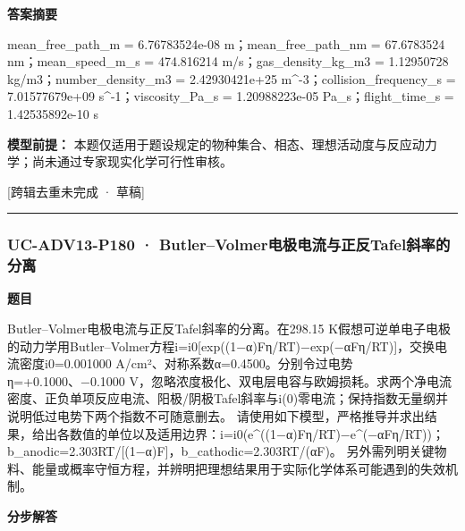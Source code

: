 \documentclass[UTF8,11pt,a4paper]{ctexart}
\begin{document}
\noindent\textbf{答案摘要}\par
mean\_free\_path\_m = 6.76783524e-08 m；mean\_free\_path\_nm = 67.6783524 nm；mean\_speed\_m\_s = 474.816214 m/s；gas\_density\_kg\_m3 = 1.12950728 kg/m3；number\_density\_m3 = 2.42930421e+25 m\textasciicircum{}-3；collision\_frequency\_s = 7.01577679e+09 s\textasciicircum{}-1；viscosity\_Pa\_s = 1.20988223e-05 Pa\_s；flight\_time\_s = 1.42535892e-10 s\par
\noindent\textbf{模型前提：}
本题仅适用于题设规定的物种集合、相态、理想活动度与反应动力学；尚未通过专家现实化学可行性审核。\par
\noindent\textcolor{red!65!black}{[跨辑去重未完成 · 草稿]} \par
\medskip\hrule\medskip
{}
\subsubsection*{UC-ADV13-P180 · Butler–Volmer电极电流与正反Tafel斜率的分离}
\noindent\textbf{题目}\par
Butler–Volmer电极电流与正反Tafel斜率的分离。在298.15 K假想可逆单电子电极的动力学用Butler–Volmer方程i=i0[exp((1−α)Fη/RT)−exp(−αFη/RT)]，交换电流密度i0=0.001000 A/cm²、对称系数α=0.4500。分别令过电势η=+0.1000、−0.1000 V，忽略浓度极化、双电层电容与欧姆损耗。求两个净电流密度、正负单项反应电流、阳极/阴极Tafel斜率与i(0)零电流；保持指数无量纲并说明低过电势下两个指数不可随意删去。 请使用如下模型，严格推导并求出结果，给出各数值的单位以及适用边界：i=i0(e\textasciicircum{}((1−α)Fη/RT)−e\textasciicircum{}(−αFη/RT))；b\_anodic=2.303RT/[(1−α)F]，b\_cathodic=2.303RT/(αF)。 另外需列明关键物料、能量或概率守恒方程，并辨明把理想结果用于实际化学体系可能遇到的失效机制。\par
\medskip\noindent\textbf{分步解答}
\end{document}
